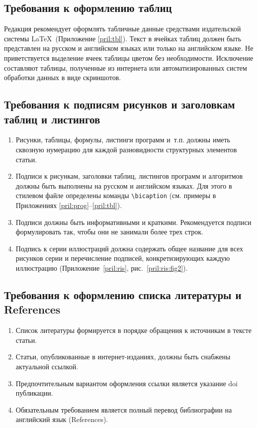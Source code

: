 \documentclass[10pt,a4paper]{book}
\begin{document}
    
\subsection{Требования к оформлению таблиц}
Редакция рекомендует оформлять табличные данные средствами издательской 
системы \LaTeX\ (Приложение \ref{pril:tbl}). 
Текст в ячейках таблиц должен быть представлен на русском и 
английском языках или только на английском языке.
Не приветствуется выделение ячеек таблицы цветом без необходимости.
Исключение составляют таблицы, полученные из интернета или 
автоматизированных систем обработки данных в виде скриншотов.


\subsection{Требования к подписям рисунков и заголовкам таблиц и листингов}
\begin{enumerate}[itemsep=0pt,parsep=2pt,topsep=2pt,partopsep=0pt]
\item Рисунки, таблицы, формулы, листинги программ и~т.п. должны иметь
        сквозную нумерацию для каждой разновидности структурных элементов статьи.
\item Подписи к рисункам, заголовки таблиц, листингов программ и алгоритмов
      должны быть выполнены на русском и английском языках. Для этого в
      стилевом файле определены команды \verb!\bicaption! (см. примеры 
      в Приложениях \ref{pril:prog}--\ref{pril:tbl}).
\item Подписи должны быть информативными и краткими. Рекомендуется подписи 
      формулировать так, чтобы они не занимали более трех строк.
\item Подпись к серии иллюстраций должна содержать общее название для всех
      рисунков серии и перечисление подписей, конкретизирующих каждую иллюстрацию 
      (Приложение~\ref{pril:ris}, рис.~\ref{pril:ris:fig2}).
\end{enumerate}

\subsection{Требования к оформлению списка литературы и References}
\begin{enumerate}[itemsep=0pt,parsep=2pt,topsep=2pt,partopsep=0pt]
\item Список литературы формируется в порядке обращения к источникам в 
      тексте статьи.
\item Статьи, опубликованные в интернет-изданиях, должны быть снабжены
      актуальной ссылкой.
\item Предпочтительным вариантом оформления ссылки является указание doi публикации.
\item Обязательным требованием является полный перевод библиографии 
      на английский язык (References).
\end{enumerate}
\end{document}

